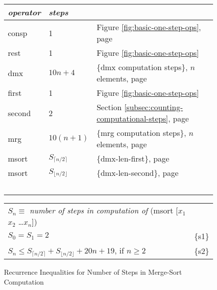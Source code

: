 \begin{figure}
\begin{center}
\begin{tabular}{lll}
  \emph{operator} & \emph{steps} & \\
  \hline
   consp  & 1 & Figure \ref{fig:basic-one-step-ops}, page \pageref{fig:basic-one-step-ops}  \\
   rest   & 1 & Figure \ref{fig:basic-one-step-ops} \\
   dmx    & $10n+4$ & \{dmx computation steps\}, $n$ elements, page \pageref{thm:dmx-computation-time}\\
   first  & 1 & Figure \ref{fig:basic-one-step-ops} \\
   second & 2 & Section \ref{subsec:counting-computational-steps}, page \pageref{steps-in-second-op} \\
   mrg    & $10(n+1)$ & \{mrg computation steps\}, $n$ elements, page \pageref{thm:mrg-computation-time}\\
   msort  & $S_{\lceil  n/2 \rceil}$  & \{dmx-len-first\}, page \pageref{thm:dmx-length-first-second} \\
   msort  & $S_{\lfloor n/2 \rfloor}$ & \{dmx-len-second\}, page \pageref{thm:dmx-length-first-second} \\
   \hline
   ~~~~ & & \\
\end{tabular}

\begin{tabular}{ll}
   $S_n \equiv$ \emph{number of steps in computation of} (msort [$x_1$ $x_2$ \dots $x_n$]) \\
   $S_0 = S_1 = 2$ & \{s1\}\\
   $S_{n} \leq S_{\lceil n/2 \rceil} + S_{\lfloor n/2 \rfloor} + 20n + 19$, if $n \geq 2$ & \{s2\}\\
\end{tabular}
\end{center}
\caption{Recurrence Inequalities for Number of Steps in Merge-Sort Computation}
\label{msort-recurrences}
\end{figure}

